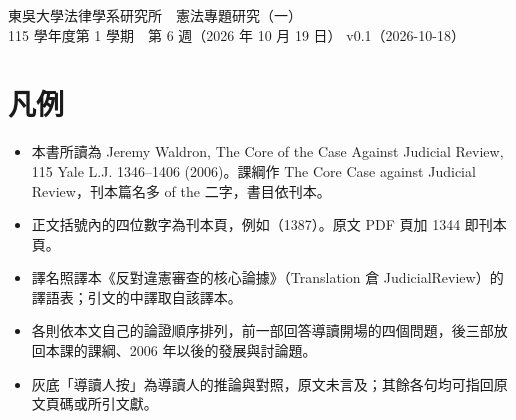 \documentclass[11pt,oneside,openany]{book}
\newcommand{\pg}[1]{（#1）}
\newcommand{\documentversion}{v0.1（2026-10-18）}
\begin{document}
\frontmatter
{}%
  {東吳大學法律學系研究所　憲法專題研究（一）\\115 學年度第 1 學期　第 6 週（2026 年 10 月 19 日）}%
  {\documentversion}
\tableofcontents

\chapter*{凡例}
\begin{itemize}
\item 本書所讀為 Jeremy Waldron, The Core of the Case Against Judicial Review, 115 Yale L.J. 1346--1406 (2006)。課綱作 The Core Case against Judicial Review，刊本篇名多 of the 二字，書目依刊本。
\item 正文括號內的四位數字為刊本頁，例如\pg{1387}。原文 PDF 頁加 1344 即刊本頁。
\item 譯名照譯本《反對違憲審查的核心論據》（Translation 倉 JudicialReview）的譯語表；引文的中譯取自該譯本。
\item 各則依本文自己的論證順序排列，前一部回答導讀開場的四個問題，後三部放回本課的課綱、2006 年以後的發展與討論題。
\item 灰底「導讀人按」為導讀人的推論與對照，原文未言及；其餘各句均可指回原文頁碼或所引文獻。
\end{itemize}

\mainmatter













\backmatter
\printbibliography[heading=bibintoc,title={引用文獻}]
\end{document}

